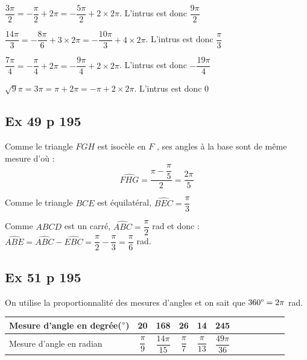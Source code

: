 \documentclass[a4paper,french]{book}
\begin{document}
\begin{enumMet}
    \item $\dfrac{3\pi}{2}=-\dfrac{\pi}{2}+2\pi=-\dfrac{5\pi}{2}+2\times2\pi$. L'intrus est donc $\dfrac{9\pi}{2}$
    \item $\dfrac{14\pi}{3}=-\dfrac{8\pi}{6}+3\times2\pi=-\dfrac{10\pi}{3}+4\times2\pi$. L'intrus est donc $\dfrac{\pi}{3}$
    \item $\dfrac{7\pi}{4}=-\dfrac{\pi}{4}+2\pi=-\dfrac{9\pi}{4}+2\times2\pi$. L'intrus est donc $-\dfrac{19\pi}{4}$
    \item $\sqrt{9}\pi=3\pi=\pi+2\pi=-\pi+2\times2\pi$. L'intrus est donc $0$
\end{enumMet}

\subsection*{Ex 49 p 195}

\begin{itemMet}
    \item Comme le triangle $FGH$  est isocèle en $F$ , ses angles à la base sont de même mesure d’où : \\
$$\widehat{FHG}=\dfrac{\pi-\dfrac{\pi}{5}}{2}=\dfrac{2\pi}{5}$$
    \item Comme le triangle $BCE$ est équilatéral, $\widehat{BEC}=\dfrac{\pi}{3}$ 
    \item Comme $ABCD$ est un carré, $\widehat{ABC}=\dfrac{\pi}{2}$ rad et donc :\\ $\widehat{ABE}=\widehat{ABC}-\widehat{EBC}=\dfrac{\pi}{2}-\dfrac{\pi}{3}=\dfrac{\pi}{6}$ rad.
\end{itemMet}

\vspace*{-.2cm}

\subsection*{Ex 51 p 195}
On utilise la proportionnalité des mesures d'angles et on sait que $360\degree=2\pi$ rad.\\
\begin{tabular}{ | Xc | Xc | Xc | Xc | Xc | Xc |}
    \hline			
    Mesure d'angle en degrée($\degree$)  & 20 & 168 & 26 & 14 & 245 \\ \hline
    Mesure d'angle en radian & $\dfrac{\pi}{9}$ & $\dfrac{14\pi}{15}$ & $\dfrac{\pi}{7}$ & $\dfrac{\pi}{13}$ & $\dfrac{49\pi}{36}$ \\
    \hline  
\end{tabular}
\end{document}
